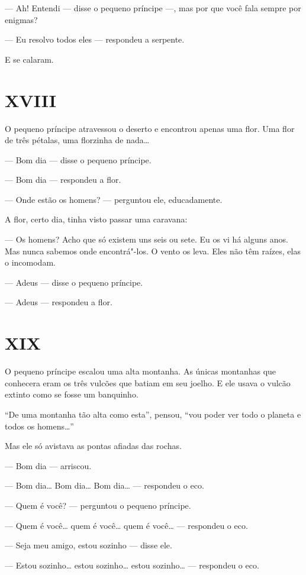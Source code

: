 \begin{Parallel}[p]{}{}
{--- Ah! Entendi --- disse o pequeno príncipe ---, mas por que você fala
sempre por enigmas?

--- Eu resolvo todos eles --- respondeu a serpente.

E se calaram.

\section{XVIII}

O pequeno príncipe atravessou o deserto e encontrou apenas uma flor. Uma
flor de três pétalas, uma florzinha de nada\ldots{}

--- Bom dia --- disse o pequeno príncipe.

--- Bom dia --- respondeu a flor.

--- Onde estão os homens? --- perguntou ele, educadamente.

A flor, certo dia, tinha visto passar uma caravana:

--- Os homens? Acho que só existem uns seis ou sete. Eu os vi há alguns
anos. Mas nunca sabemos onde encontrá"-los. O vento os leva. Eles não têm
raízes, elas o incomodam.

--- Adeus --- disse o pequeno príncipe.

--- Adeus --- respondeu a flor.

\section{XIX}

O pequeno príncipe escalou uma alta montanha. As únicas montanhas que
conhecera eram os três vulcões que batiam em seu joelho. E ele usava o
vulcão extinto como se fosse um banquinho.

``De uma montanha tão alta como esta'', pensou, ``vou poder ver todo o
planeta e todos os homens\ldots{}''

Mas ele só avistava as pontas afiadas das rochas.

--- Bom dia --- arriscou.

--- Bom dia\ldots{} Bom dia\ldots{} Bom dia\ldots{} --- respondeu o eco.

--- Quem é você? --- perguntou o pequeno príncipe.

--- Quem é você\ldots{} quem é você\ldots{} quem é você\ldots{} --- respondeu o eco.

--- Seja meu amigo, estou sozinho --- disse ele.

--- Estou sozinho\ldots{} estou sozinho\ldots{} estou sozinho\ldots{} --- respondeu o eco.

}
\end{Parallel}
